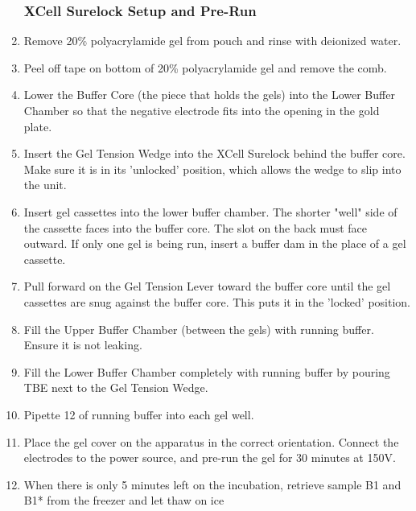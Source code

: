 \documentclass{ssiBio}
\begin{document}
\begin{enumerate}
\subsubsection{XCell Surelock Setup and Pre-Run}
\item{Remove 20\% polyacrylamide gel from pouch and rinse with deionized water.}
\item{Peel off tape on bottom of 20\% polyacrylamide gel and remove the comb.}
\item{Lower the Buffer Core (the piece that holds the gels) into the Lower Buffer Chamber so that the negative electrode fits into the opening in the gold plate.}
\item{Insert the Gel Tension Wedge into the XCell Surelock behind the buffer core. Make sure it is in its 'unlocked' position, which allows the wedge to slip into the unit.}
\item{Insert gel cassettes into the lower buffer chamber. The shorter "well" side of the cassette faces into the buffer core. The slot on the back must face outward. If only one gel is being run, insert a buffer dam in the place of a gel cassette.}
\item{Pull forward on the Gel Tension Lever toward the buffer core until the gel cassettes are snug against the buffer core. This puts it in the 'locked' position.}
\item{Fill the Upper Buffer Chamber (between the gels) with running buffer. Ensure it is not leaking.}
\item{Fill the Lower Buffer Chamber completely with running buffer by pouring TBE next to the Gel Tension Wedge.}
\item{Pipette 12\uL{} of running buffer into each gel well.}
\item{Place the gel cover on the apparatus in the correct orientation. Connect the electrodes to the power source, and pre-run the gel for 30 minutes at 150V.}
\item{When there is only 5 minutes left on the incubation, retrieve sample B1 and B1* from the freezer and let thaw on ice}

\end{enumerate}
\end{document}
